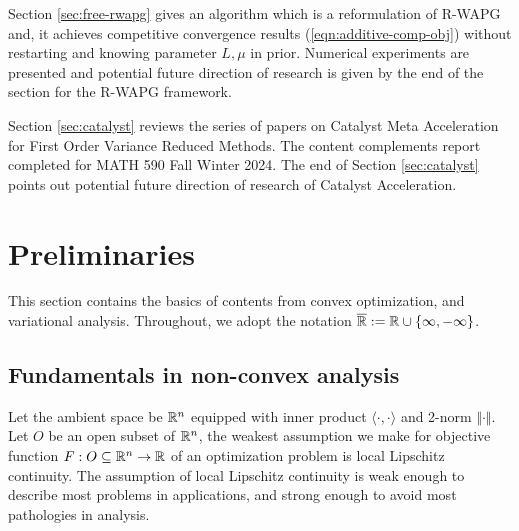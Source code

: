 \documentclass[12pt]{article}
\begin{document}
    \par
    Section \ref{sec:free-rwapg} gives an algorithm which is a reformulation of R-WAPG and, it achieves competitive convergence results (\ref{eqn:additive-comp-obj}) without restarting and knowing parameter $L, \mu$ in prior. 
    Numerical experiments are presented and potential future direction of research is given by the end of the section for the R-WAPG framework. 
    \par
    Section \ref{sec:catalyst} reviews the series of papers \cite{lin_universal_2015,lin_catalyst_2018,paquette_catalyst_2018} on Catalyst Meta Acceleration for First Order Variance Reduced Methods. 
    The content complements report completed for MATH 590 Fall Winter 2024. 
    The end of Section \ref{sec:catalyst} points out potential future direction of research of Catalyst Acceleration. 

    
\section{Preliminaries}
    This section contains the basics of contents from convex optimization, and variational analysis. 
    Throughout, we adopt the notation $\overline {\mathbb R} := \mathbb R \cup \{\infty, -\infty\}$. 
    
    \subsection{Fundamentals in non-convex analysis}
        Let the ambient space be $\mathbb R^n$ equipped with inner product $\langle \cdot, \cdot\rangle$ and 2-norm $\Vert \cdot\Vert$. 
        Let $O$ be an open subset of $\mathbb R^n$, the weakest assumption we make for objective function $F: O \subseteq \mathbb R^n \rightarrow \mathbb R$ of an optimization problem is local Lipschitz continuity. 
        The assumption of local Lipschitz continuity is weak enough to describe most problems in applications, and strong enough to avoid most pathologies in analysis. 
\end{document}

